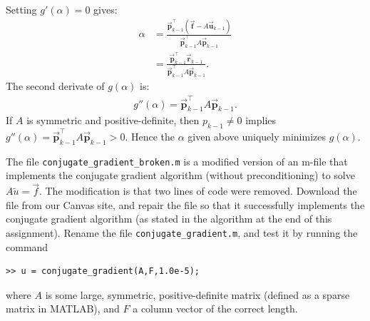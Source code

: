 \documentclass[10pt,oneside,openany]{memoir}
\begin{document}
\begin{solution}
        Setting $g'(\alpha) = 0$ gives:
            \begin{equation*}
            \begin{split}
                \alpha
                &= \frac{\vec{\boldsymbol{p}}_{k-1}^{\top}(\vec{\boldsymbol{f}}-A\vec{\boldsymbol{u}}_{k-1})}
                {\vec{\boldsymbol{p}}_{k-1}^{\top}A\vec{\boldsymbol{p}}_{k-1}} \\
                &= \frac{\vec{\boldsymbol{p}}_{k-1}^{\top}\vec{\boldsymbol{r}}_{k-1}}{\vec{\boldsymbol{p}}_{k-1}^{\top}A\vec{\boldsymbol{p}}_{k-1}}.
            \end{split}
            \end{equation*}
        The second derivate of $g(\alpha)$ is:
            \begin{equation*}
            \begin{split}
                g''(\alpha) = \vec{\boldsymbol{p}}_{k-1}^{\top}A\vec{\boldsymbol{p}}_{k-1}.
            \end{split}
            \end{equation*}
        If $A$ is symmetric and positive-definite, then $p_{k-1} \neq 0$ implies $g''(\alpha) = \vec{\boldsymbol{p}}_{k-1}^{\top}A\vec{\boldsymbol{p}}_{k-1} > 0$. Hence the $\alpha$ given above uniquely minimizes $g(\alpha)$.
    \end{solution}
\newpage
\begin{exercise}[manual-num={4.3}]
The file \texttt{conjugate\_gradient\_broken.m} is a modified version of an m-file that implements the conjugate gradient algorithm (without preconditioning) to solve \(A\tilde{u}=\vec{f}\). The modification is that two lines of code were removed. Download the file from our Canvas site, and repair the file so that it successfully implements the conjugate gradient algorithm (as stated in the algorithm at the end of this assignment).
Rename the file \texttt{conjugate\_gradient.m}, and test it by running the command
\begin{verbatim}
>> u = conjugate_gradient(A,F,1.0e-5);
\end{verbatim}
where \(A\) is some large, symmetric, positive-definite matrix (defined as a sparse matrix in MATLAB), and \(F\) a column vector of the correct length.
\end{exercise}
\end{document}
